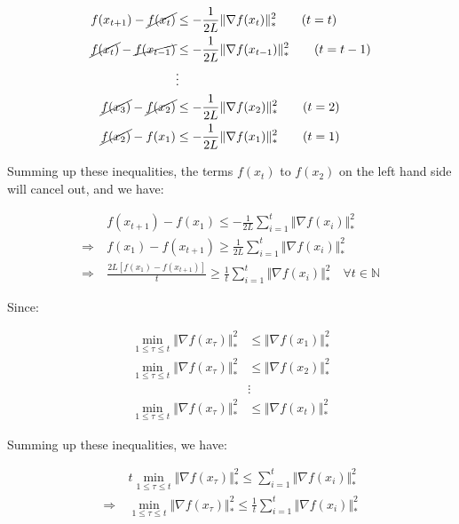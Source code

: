 \documentclass{article}
\begin{document}
\begin{align*}
    f ( x_{t + 1} ) - \cancel{f ( x_t )} &\leq -\frac{1}{2L} \Vert \nabla f ( x_t ) \Vert_*^2 \qquad (t = t) \\
    \cancel{f ( x_t )} - \cancel{f ( x_{t - 1} )} &\leq -\frac{1}{2L} \Vert \nabla f ( x_{t - 1} ) \Vert_*^2 \qquad (t = t - 1) \\
    &\vdots \\
    \cancel{f ( x_3 )} - \cancel{f ( x_2 )} &\leq -\frac{1}{2L} \Vert \nabla f ( x_2 ) \Vert_*^2 \qquad (t = 2) \\
    \cancel{f ( x_2 )} - f ( x_1 ) &\leq -\frac{1}{2L} \Vert \nabla f ( x_1 ) \Vert_*^2 \qquad (t = 1) 
\end{align*}

Summing up these inequalities, the terms $f(x_t)$ to $f(x_2)$ on the left hand side will cancel out, and we have:

\begin{align*}
    &f(x_{t+1}) - f(x_1) \leq -\frac{1}{2L} \sum_{i=1}^{t} \Vert \nabla f ( x_i ) \Vert_*^2 \\
    \Rightarrow \ &f(x_1) - f(x_{t+1}) \geq \frac{1}{2L} \sum_{i=1}^{t} \Vert \nabla f ( x_i ) \Vert_*^2 \\
    \Rightarrow \ &\frac{2L \left[ f(x_1) - f(x_{t+1}) \right]}{t} \geq \frac{1}{t} \sum_{i=1}^{t} \Vert \nabla f ( x_i ) \Vert_*^2 \quad \forall t \in \mathbb{N} \tag{1}
\end{align*}

Since:

\begin{align*}
    \min_{1 \leq \tau \leq t} \Vert \nabla f ( x_\tau ) \Vert_*^2 &\leq \Vert \nabla f(x_1) \Vert_*^2 \\
    \min_{1 \leq \tau \leq t} \Vert \nabla f ( x_\tau ) \Vert_*^2 &\leq \Vert \nabla f(x_2) \Vert_*^2 \\
    &\vdots \\
    \min_{1 \leq \tau \leq t} \Vert \nabla f ( x_\tau ) \Vert_*^2 &\leq \Vert \nabla f(x_t) \Vert_*^2
\end{align*}

Summing up these inequalities, we have:

\begin{align*}
    &t \min_{1 \leq \tau \leq t} \Vert \nabla f ( x_\tau ) \Vert_*^2 \leq \sum_{i=1}^{t} \Vert \nabla f ( x_i ) \Vert_*^2 \\
    \Rightarrow \ &\min_{1 \leq \tau \leq t} \Vert \nabla f ( x_\tau ) \Vert_*^2 \leq \frac{1}{t} \sum_{i=1}^{t} \Vert \nabla f ( x_i ) \Vert_*^2
\end{align*}
\end{document}
